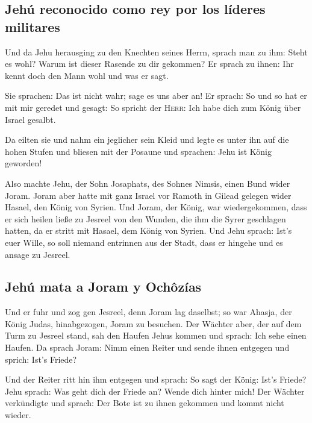 \hypertarget{jehuxfa-reconocido-como-rey-por-los-luxedderes-militares}{%
\subsection{Jehú reconocido como rey por los líderes
militares}\label{jehuxfa-reconocido-como-rey-por-los-luxedderes-militares}}

 Und da Jehu herausging zu den Knechten seines Herrn,
sprach man zu ihm: Steht es wohl? Warum ist dieser Rasende zu dir
gekommen? Er sprach zu ihnen: Ihr kennt doch den Mann wohl und was er
sagt.

 Sie sprachen: Das ist nicht wahr; sage es uns aber an!
Er sprach: So und so hat er mit mir geredet und gesagt: So spricht der
\textsc{Herr}: Ich habe dich zum König über Israel gesalbt.

 Da eilten sie und nahm ein jeglicher sein Kleid und
legte es unter ihn auf die hohen Stufen und bliesen mit der Posaune und
sprachen: Jehu ist König geworden!

 Also machte Jehu, der Sohn Josaphats, des Sohnes Nimsis,
einen Bund wider Joram. Joram aber hatte mit ganz Israel vor Ramoth in
Gilead gelegen wider Hasael, den König von Syrien.  Und
Joram, der König, war wiedergekommen, dass er sich heilen ließe zu
Jesreel von den Wunden, die ihm die Syrer geschlagen hatten, da er
stritt mit Hasael, dem König von Syrien. Und Jehu sprach: Ist's euer
Wille, so soll niemand entrinnen aus der Stadt, dass er hingehe und es
ansage zu Jesreel.

\hypertarget{jehuxfa-mata-a-joram-y-ochuxf4zuxedas}{%
\subsection{Jehú mata a Joram y
Ochôzías}\label{jehuxfa-mata-a-joram-y-ochuxf4zuxedas}}

 Und er fuhr und zog gen Jesreel, denn Joram lag
daselbst; so war Ahasja, der König Judas, hinabgezogen, Joram zu
besuchen.  Der Wächter aber, der auf dem Turm zu Jesreel
stand, sah den Haufen Jehus kommen und sprach: Ich sehe einen Haufen. Da
sprach Joram: Nimm einen Reiter und sende ihnen entgegen und sprich:
Ist's Friede?

 Und der Reiter ritt hin ihm entgegen und sprach: So sagt
der König: Ist's Friede? Jehu sprach: Was geht dich der Friede an? Wende
dich hinter mich! Der Wächter verkündigte und sprach: Der Bote ist zu
ihnen gekommen und kommt nicht wieder.

